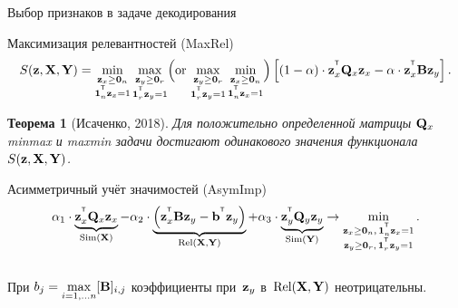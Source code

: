 \documentclass[10pt]{beamer}
\newtheorem{rustheorem}{Теорема}
\begin{document}
\begin{frame}{Выбор признаков в задаче декодирования}
	\begin{block}{Максимизация релевантностей (MaxRel)}
	\vspace{-0.4cm}
	\[
		S(\bz, \bX, \bY) = \min_{\substack{\bz_x \geq \bZero_n \\ \bOne_n^{\T}\bz_x=1}} 	\max_{\substack{\bz_y \geq \bZero_r \\ \bOne_r^{\T}\bz_y=1}}  \Bigl(\text {or} \, \max_{\substack{\bz_y \geq \bZero_r \\ \bOne_r^{\T}\bz_y=1}} \min_{\substack{\bz_x \geq \bZero_n \\ \bOne_n^{\T}\bz_x=1}}\Bigr)  \left[ (1 - \alpha) \cdot \bz_x^{\T} \bQ_x \bz_x - \alpha \cdot \bz_x^{\T} \bB \bz_y \right].
	\]
	\vspace{-0.2cm}
	\end{block}
	\begin{rustheorem}[Исаченко, 2018]
		Для положительно определенной матрицы $\bQ_x$ minmax и maxmin задачи достигают одинакового значения функционала $S(\bz, \bX, \bY)$.
	\end{rustheorem}
	\begin{block}{Асимметричный учёт значимостей (AsymImp)}
	\vspace{-0.2cm}
	\begin{equation*}
	\alpha_1 \cdot \underbrace{\bz_x^{\T} \bQ_x \bz_x}_{\text{Sim}(\bX)} - \alpha_2 \cdot  \underbrace{\left(\bz_x^{\T} \bB \bz_y - \bb^{\T} \bz_y \right) }_{\text{Rel}(\bX, \bY)} + \alpha_3 \cdot \underbrace{\bz_y^{\T} \bQ_y \bz_y}_{\text{Sim}(\bY)} \rightarrow \min_{\substack{\bz_x \geq \bZero_n, \, \bOne_n^{\T}\bz_x=1 \\ \bz_y \geq \bZero_r, \, \bOne_r^{\T}\bz_y=1}}.
	\end{equation*}
	\vspace{-0.4cm} \\
	При $b_j = \max\limits_{i=1, \dots n} [\bB]_{i, j}$ коэффициенты при~$\bz_y$ в~$\text{Rel}(\bX, \bY)$ неотрицательны.
\end{block}
\end{frame}
\end{document}
